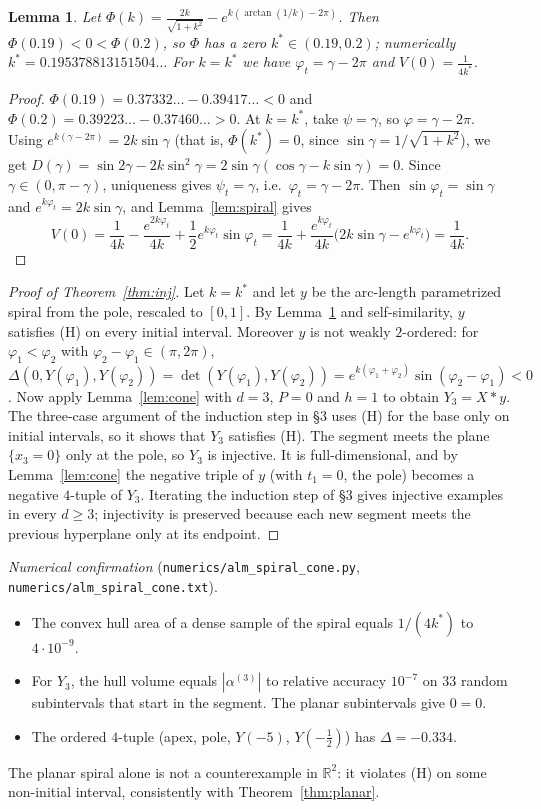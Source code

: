 \documentclass[11pt]{amsart}
\newtheorem{lemma}[theorem]{Lemma}
\theoremstyle{definition}
\newcommand{\R}{\mathbb{R}}
\begin{document}
\begin{lemma}\label{lem:kstar}
Let $\Phi(k)=\frac{2k}{\sqrt{1+k^2}}-e^{k(\arctan(1/k)-2\pi)}$. Then $\Phi(0.19)<0<\Phi(0.2)$, so $\Phi$ has a zero $k^*\in(0.19,0.2)$; numerically $k^*=0.195378813151504\ldots$
For $k=k^*$ we have $\varphi_t=\gamma-2\pi$ and $V(0)=\frac1{4k^*}$.
\end{lemma}
\begin{proof}
$\Phi(0.19)=0.37332\ldots-0.39417\ldots<0$ and $\Phi(0.2)=0.39223\ldots-0.37460\ldots>0$. At $k=k^*$, take $\psi=\gamma$, so $\varphi=\gamma-2\pi$. Using
$e^{k(\gamma-2\pi)}=2k\sin\gamma$ (that is, $\Phi(k^*)=0$, since $\sin\gamma=1/\sqrt{1+k^2}$), we get
$D(\gamma)=\sin2\gamma-2k\sin^2\gamma=2\sin\gamma(\cos\gamma-k\sin\gamma)=0$. Since $\gamma\in(0,\pi-\gamma)$, uniqueness gives $\psi_t=\gamma$, i.e.\ $\varphi_t=\gamma-2\pi$.
Then $\sin\varphi_t=\sin\gamma$ and $e^{k\varphi_t}=2k\sin\gamma$, and Lemma~\ref{lem:spiral} gives
\[
V(0)=\frac1{4k}-\frac{e^{2k\varphi_t}}{4k}+\frac12e^{k\varphi_t}\sin\varphi_t=\frac1{4k}+\frac{e^{k\varphi_t}}{4k}\big(2k\sin\gamma-e^{k\varphi_t}\big)=\frac1{4k}.
\]
\end{proof}

\begin{proof}[Proof of Theorem~\ref{thm:inj}]
Let $k=k^*$ and let $y$ be the arc-length parametrized spiral from the pole, rescaled to $[0,1]$. By Lemma~\ref{lem:kstar} and self-similarity, $y$ satisfies (H) on every
initial interval. Moreover $y$ is not weakly $2$-ordered: for $\varphi_1<\varphi_2$ with $\varphi_2-\varphi_1\in(\pi,2\pi)$,
$\Delta(0,Y(\varphi_1),Y(\varphi_2))=\det(Y(\varphi_1),Y(\varphi_2))=e^{k(\varphi_1+\varphi_2)}\sin(\varphi_2-\varphi_1)<0$.
Now apply Lemma~\ref{lem:cone} with $d=3$, $P=0$ and $h=1$ to obtain $Y_3=X*y$. The three-case argument of the induction step in \S3 uses (H) for the base only on
initial intervals, so it shows that $Y_3$ satisfies (H). The segment meets the plane $\{x_3=0\}$ only at the pole, so $Y_3$ is injective. It is full-dimensional, and by
Lemma~\ref{lem:cone} the negative triple of $y$ (with $t_1=0$, the pole) becomes a negative $4$-tuple of $Y_3$. Iterating the induction step of \S3 gives injective examples in every
$d\ge3$; injectivity is preserved because each new segment meets the previous hyperplane only at its endpoint.
\end{proof}

\noindent\emph{Numerical confirmation} (\texttt{numerics/alm\_spiral\_cone.py}, \texttt{numerics/alm\_spiral\_cone.txt}).
\begin{itemize}
\item The convex hull area of a dense sample of the spiral equals $1/(4k^*)$ to $4\cdot10^{-9}$.
\item For $Y_3$, the hull volume equals $|\alpha^{(3)}|$ to relative accuracy $10^{-7}$ on $33$ random subintervals that start in the segment. The planar subintervals give $0=0$.
\item The ordered $4$-tuple (apex, pole, $Y(-5)$, $Y(-\frac12)$) has $\Delta=-0.334$.
\end{itemize}
The planar spiral alone is not a counterexample in $\R^2$: it violates (H) on some non-initial interval, consistently with Theorem~\ref{thm:planar}.
\end{document}
